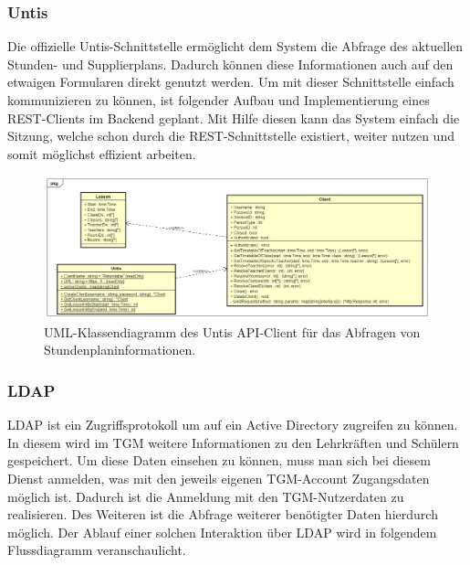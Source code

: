 \subsubsection{Untis}

Die offizielle Untis-Schnittstelle ermöglicht dem System die Abfrage des aktuellen Stunden- und Supplierplans. Dadurch können diese Informationen auch auf den etwaigen Formularen direkt genutzt werden. Um mit dieser Schnittstelle einfach kommunizieren zu können, ist folgender Aufbau und Implementierung eines REST-Clients im Backend geplant. Mit Hilfe diesen kann das System einfach die Sitzung, welche schon durch die REST-Schnittstelle existiert, weiter nutzen und somit möglichst effizient arbeiten.

\begin{figure}[H]
	\centering
	\includegraphics[width=\linewidth]{images/mbeier_konzept/Untis}
	\caption[Untis API-Client UML-Klassendiagramm]{UML-Klassendiagramm des Untis API-Client für das Abfragen von Stundenplaninformationen.}
	\label{fig:untis}
\end{figure}

\newpage

\subsubsection{LDAP}

LDAP ist ein Zugriffsprotokoll um auf ein Active Directory zugreifen zu können. In diesem wird im TGM weitere Informationen zu den Lehrkräften und Schülern gespeichert. Um diese Daten einsehen zu können, muss man sich bei diesem Dienst anmelden, was mit den jeweils eigenen TGM-Account Zugangsdaten möglich ist. Dadurch ist die Anmeldung mit den TGM-Nutzerdaten zu realisieren. Des Weiteren ist die Abfrage weiterer benötigter Daten hierdurch möglich. Der Ablauf einer solchen Interaktion über LDAP wird in folgendem Flussdiagramm veranschaulicht.

